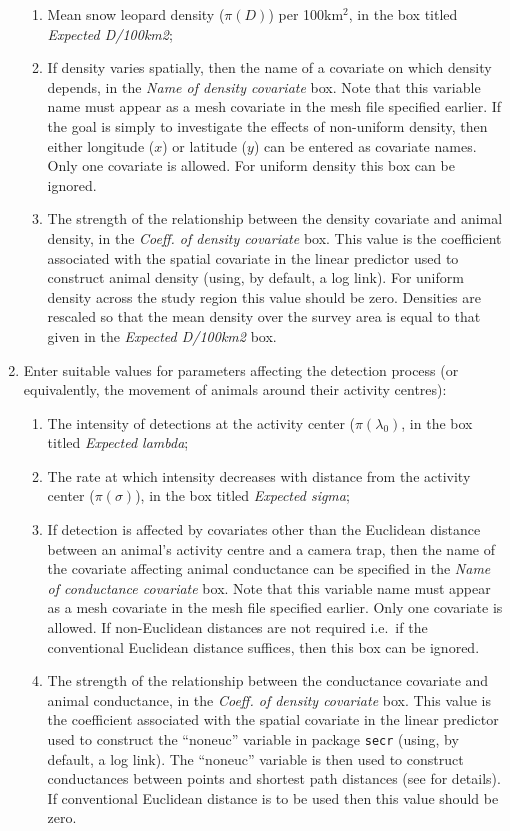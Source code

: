 \documentclass[a4paper,11pt]{article} %
\begin{document}
\begin{enumerate}
\begin{enumerate}
\item Mean snow leopard density ($\pi(D)$) per 100km$^2$, in the box titled \textit{Expected D/100km2};
\item If density varies spatially, then the name of a covariate on which density depends, in the {\it Name of density covariate} box. Note that this variable name must appear as a mesh covariate in the mesh file specified earlier. If the goal is simply to investigate the effects of non-uniform density, then either longitude ($x$) or latitude ($y$) can be entered as covariate names. Only one covariate is allowed. For uniform density this box can be ignored.
\item The strength of the relationship between the density covariate and animal density, in the {\it Coeff. of density covariate} box. This value is the coefficient associated with the spatial covariate in the linear predictor used to construct animal density (using, by default, a log link). For uniform density across the study region this value should be zero. Densities are rescaled so that the mean density over the survey area is equal to that given in the \textit{Expected D/100km2} box.
\end{enumerate}
\item Enter suitable values for parameters affecting the detection process (or equivalently, the movement of animals around their activity centres):
\begin{enumerate}
\item The intensity of detections at the activity center ($\pi(\lambda_0)$, in the box titled \textit{Expected lambda};
\item The rate at which intensity decreases with distance from the activity center ($\pi(\sigma)$), in the box titled \textit{Expected sigma};
\item If detection is affected by covariates other than the Euclidean distance between an animal's activity centre and a camera trap, then the name of the covariate affecting animal conductance can be specified in the {\it Name of conductance covariate} box. Note that this variable name must appear as a mesh covariate in the mesh file specified earlier. Only one covariate is allowed. If non-Euclidean distances are not required i.e.\ if the conventional Euclidean distance suffices, then this box can be ignored.
\item The strength of the relationship between the conductance covariate and animal conductance, in the {\it Coeff. of density covariate} box. This value is the coefficient associated with the spatial covariate in the linear predictor used to construct the ``noneuc'' variable in package \texttt{secr} (using, by default, a log link). The ``noneuc'' variable is then used to construct conductances between points and shortest path distances (see \cite{Sutherland2015} for details). If conventional Euclidean distance is to be used then this value should be zero. 

\end{enumerate}
\end{enumerate}
\end{document}
